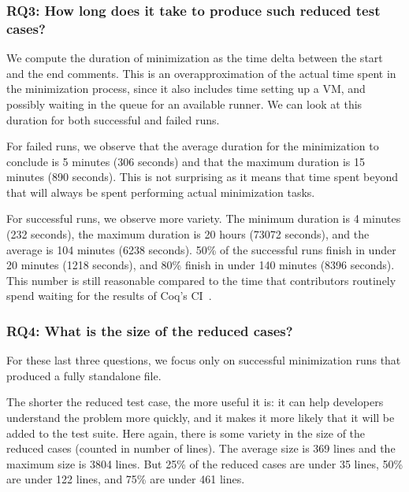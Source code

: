 \documentclass[a4paper,USenglish,cleveref,autoref,thm-restate]{lipics-v2021}
\begin{document}
\subsubsection{RQ3: How long does it take to produce such reduced test cases?}

We compute the duration of minimization as the time delta between the start and the end comments.
This is an overapproximation of the actual time spent in the minimization process, since it also includes time setting up a VM, and possibly waiting in the queue for an available runner.
%
We can look at this duration for both successful and failed runs.

For failed runs, we observe that the average duration for the minimization to conclude is 5 minutes (306 seconds) and that the maximum duration is 15 minutes (890 seconds). This is not surprising as it means that time spent beyond that will always be spent performing actual minimization tasks.

For successful runs, we observe more variety. The minimum duration is 4 minutes (232 seconds), the maximum duration is 20 hours (73072 seconds), and the average is 104 minutes (6238 seconds). 50\% of the successful runs finish in under 20 minutes (1218 seconds), and 80\% finish in under 140 minutes (8396 seconds). This number is still reasonable compared to the time that contributors routinely spend waiting for the results of Coq's CI~\cite{zimmermann:tel-02451322}.

\subsubsection{RQ4: What is the size of the reduced cases?}

For these last three questions, we focus only on successful minimization runs that produced a fully standalone file.

The shorter the reduced test case, the more useful it is: it can help developers understand the problem more quickly, and it makes it more likely that it will be added to the test suite. Here again, there is some variety in the size of the reduced cases (counted in number of lines). The average size is 369 lines and the maximum size is 3804 lines. But 25\% of the reduced cases are under 35 lines, 50\% are under 122 lines, and 75\% are under 461 lines.
\end{document}
